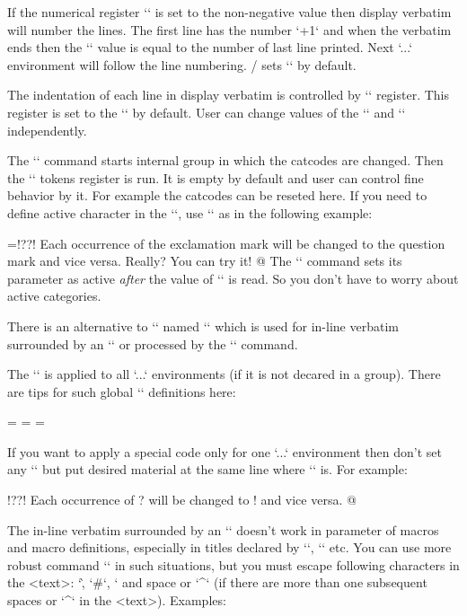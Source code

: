 If the numerical register `\ttline` is set to the non-negative value then
display verbatim will number the lines. The first line has the number
`\ttline+1` and when the verbatim ends then the `\ttline` value is equal to the
number of last line printed. Next `\begtt...\endtt` environment will follow
the line numbering. \OpTeX/ sets `` by default.

The indentation of each line in display verbatim is controlled by
`\ttindent` register. This register is set to the `\parindent` by default.
User can change values of the `\parindent` and `\ttindent` independently.

The `\begtt` command starts internal group in which the catcodes are changed. 
\new
Then the `\everytt` tokens register is run. It is empty by default and user can
control fine behavior by it. For example the catcodes can be reseted here. If
you need to define active character in the `\everytt`, use `\adef` as in the
following example:

\begtt   \adef@{\string\endtt}
\everytt={\adef!{?}\adef?{!}}
\begtt
Each occurrence of the exclamation mark will be changed to 
the question mark and vice versa. Really? You can try it! 
@
\endtt
%
The `\adef` command sets its parameter as active {\it after\/}
the value of `\everytt` is read. So you don't have to worry about active
categories. 

There is an alternative to `\everytt` named `\everyintt` which is used for
in-line verbatim surrounded by an `\activettchar` or processed by the `\code`
command.

The `\everytt` is applied to all `\begtt...\endtt` environments (if it is not
decared in a group). There are tips for such global `\everytt` definitions here:

\begtt
\everytt={\typosize[9/11]}      %
\everytt={}            %
\everytt={} %
\endtt

\new
If you want to apply a special code only for one `\begtt...\endtt`
environment then don't set any `\everytt` but put desired material at the 
same line where `\begtt` is. For example:

\begtt   \adef@{\string\endtt}
\begtt   \adef!{?}\adef?{!}
Each occurrence of ? will be changed to ! and vice versa. 
@
\endtt

The in-line verbatim surrounded by an `\activettchar` doesn't work in
parameter of macros and macro definitions, especially in titles declared by
`\chap`, `\sec` etc. 
\new
You can use more robust command `` in such
situations, but you must escape following characters in the <text>:
`\`, `#`, `%
and space or `^` (if there are more than one subsequent spaces or `^` in 
the <text>). Examples:

